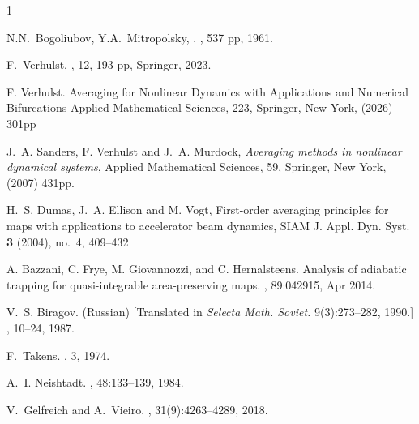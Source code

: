 \documentclass[a4paper,12pt]{article}
\begin{document}

\begin{thebibliography}{1}


    N.N.~Bogoliubov, Y.A.~Mitropolsky, 
    .
    , 537 pp, 1961. 


 F.~Verhulst, 
    , 12, 193 pp, Springer, 2023.

F. Verhulst.
\newblock Averaging for Nonlinear Dynamics with Applications and Numerical Bifurcations
\newblock
Applied Mathematical Sciences, 223, Springer, New York, (2026) 301pp 

J.~A. Sanders, F. Verhulst and J.~A. Murdock, {\it Averaging methods in nonlinear dynamical systems}, 
Applied Mathematical Sciences, 59, Springer, New York, (2007) 431pp.


H.~S. Dumas, J.~A. Ellison and M. Vogt, First-order averaging principles for maps with applications to accelerator beam dynamics, SIAM J. Appl. Dyn. Syst. {\bf 3} (2004), no.~4, 409--432


A. Bazzani, C. Frye, M. Giovannozzi, and C.
  Hernalsteens.
\newblock Analysis of adiabatic trapping for quasi-integrable area-preserving
  maps.
, 89:042915, Apr 2014.

  V.~S. Biragov.  
   (Russian) [Translated in \emph{Selecta Math. Soviet.} 9(3):273--282, 1990.]
  , 10--24, 1987.


    F.~Takens.
   , 3, 1974.

    A.~I. Neishtadt.
	, 48:133--139, 1984.
	
	V.~Gelfreich and A.~Vieiro.
	, 31(9):4263--4289, 2018.
	

\end{thebibliography}
\end{document}

